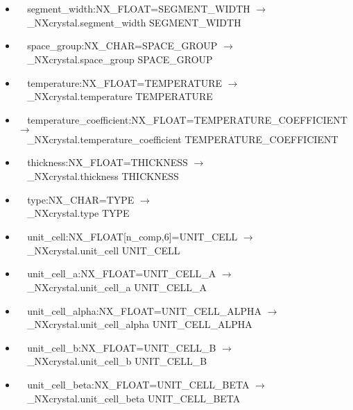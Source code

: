 \documentclass[11pt]{article}
\begin{document}
{{\begin{itemize}
\item{\verb|  |segment\_width:NX\_FLOAT=SEGMENT\_WIDTH $\rightarrow$\\
\verb|  |\_NXcrystal.segment\_width SEGMENT\_WIDTH}

\item{\verb|  |space\_group:NX\_CHAR=SPACE\_GROUP $\rightarrow$\\
\verb|  |\_NXcrystal.space\_group SPACE\_GROUP}

\item{\verb|  |temperature:NX\_FLOAT=TEMPERATURE $\rightarrow$\\
\verb|  |\_NXcrystal.temperature TEMPERATURE}

\item{\verb|  |temperature\_coefficient:NX\_FLOAT=TEMPERATURE\_COEFFICIENT $\rightarrow$\\
\verb|  |\_NXcrystal.temperature\_coefficient TEMPERATURE\_COEFFICIENT}

\item{\verb|  |thickness:NX\_FLOAT=THICKNESS $\rightarrow$\\
\verb|  |\_NXcrystal.thickness THICKNESS}

\item{\verb|  |type:NX\_CHAR=TYPE $\rightarrow$\\
\verb|  |\_NXcrystal.type TYPE}

\item{\verb|  |unit\_cell:NX\_FLOAT[n\_comp,6]=UNIT\_CELL $\rightarrow$\\
\verb|  |\_NXcrystal.unit\_cell UNIT\_CELL}

\item{\verb|  |unit\_cell\_a:NX\_FLOAT=UNIT\_CELL\_A $\rightarrow$\\
\verb|  |\_NXcrystal.unit\_cell\_a UNIT\_CELL\_A}

\item{\verb|  |unit\_cell\_alpha:NX\_FLOAT=UNIT\_CELL\_ALPHA $\rightarrow$\\
\verb|  |\_NXcrystal.unit\_cell\_alpha UNIT\_CELL\_ALPHA}

\item{\verb|  |unit\_cell\_b:NX\_FLOAT=UNIT\_CELL\_B $\rightarrow$\\
\verb|  |\_NXcrystal.unit\_cell\_b UNIT\_CELL\_B}

\item{\verb|  |unit\_cell\_beta:NX\_FLOAT=UNIT\_CELL\_BETA $\rightarrow$\\
\verb|  |\_NXcrystal.unit\_cell\_beta UNIT\_CELL\_BETA}


\end{itemize}}}
\end{document}
